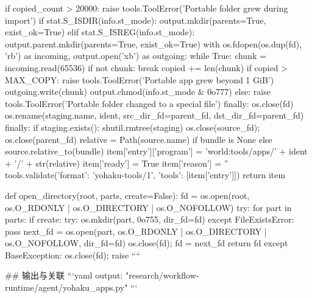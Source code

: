                 if copied_count > 20000:
                    raise tools.ToolError('Portable folder grew during import')
                if stat.S_ISDIR(info.st_mode):
                    output.mkdir(parents=True, exist_ok=True)
                elif stat.S_ISREG(info.st_mode):
                    output.parent.mkdir(parents=True, exist_ok=True)
                    with os.fdopen(os.dup(fd), 'rb') as incoming, output.open('xb') as outgoing:
                        while True:
                            chunk = incoming.read(65536)
                            if not chunk: break
                            copied += len(chunk)
                            if copied > MAX_COPY: raise tools.ToolError('Portable app grew beyond 1 GiB')
                            outgoing.write(chunk)
                    output.chmod(info.st_mode & 0o777)
                else:
                    raise tools.ToolError('Portable folder changed to a special file')
            finally:
                os.close(fd)
        os.rename(staging.name, ident, src_dir_fd=parent_fd, dst_dir_fd=parent_fd)
    finally:
        if staging.exists(): shutil.rmtree(staging)
        os.close(source_fd); os.close(parent_fd)
    relative = Path(source.name) if bundle is None else source.relative_to(bundle)
    item['entry']['program'] = 'world:tools/apps/' + ident + '/' + str(relative)
    item['ready'] = True
    item['reason'] = ''
    tools.validate({'format': 'yohaku-tools/1', 'tools': [item['entry']]})
    return item


def open_directory(root, parts, create=False):
    fd = os.open(root, os.O_RDONLY | os.O_DIRECTORY | os.O_NOFOLLOW)
    try:
        for part in parts:
            if create:
                try: os.mkdir(part, 0o755, dir_fd=fd)
                except FileExistsError: pass
            next_fd = os.open(part, os.O_RDONLY | os.O_DIRECTORY | os.O_NOFOLLOW, dir_fd=fd)
            os.close(fd); fd = next_fd
        return fd
    except BaseException:
        os.close(fd); raise
````

## 输出与关联
```yaml
output: "research/workflow-runtime/agent/yohaku_apps.py"
```

